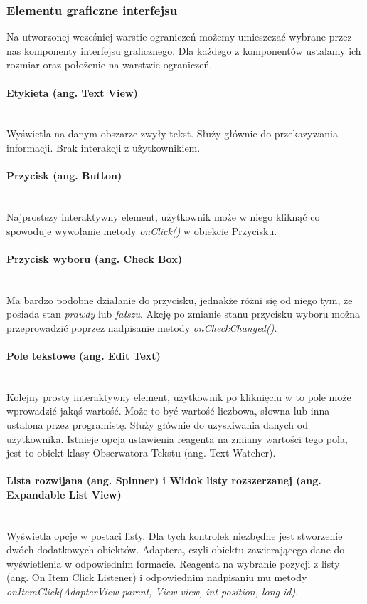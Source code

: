 \documentclass{article}
\numberwithin{equation}{section}
\begin{document}
\subsubsection{Elementu graficzne interfejsu}
Na utworzonej wcześniej warstie ograniczeń możemy umieszczać wybrane przez nas komponenty interfejsu graficznego. Dla każdego z komponentów ustalamy ich rozmiar oraz położenie na warstwie ograniczeń.
\paragraph{Etykieta (ang. Text View)}\mbox{}\\
Wyświetla na danym obszarze zwyły tekst. Służy głównie do przekazywania informacji. Brak interakcji z użytkownikiem.\citep{textview}
\paragraph{Przycisk (ang. Button)}\mbox{}\\
Najprostszy interaktywny element, użytkownik może w niego kliknąć co spowoduje wywołanie metody \textit{onClick()} w obiekcie Przycisku. \citep{button}
\paragraph{Przycisk wyboru (ang. Check Box)}\mbox{}\\
Ma bardzo podobne działanie do przycisku, jednakże różni się od niego tym, że posiada stan \textit{prawdy} lub \textit{fałszu}. Akcję po zmianie stanu przycisku wyboru można przeprowadzić poprzez nadpisanie metody \textit{onCheckChanged()}.
\paragraph{Pole tekstowe (ang. Edit Text)}\mbox{}\\
Kolejny prosty interaktywny element, użytkownik po kliknięciu w to pole może wprowadzić jakąś wartość. Może to być wartość liczbowa, słowna lub inna ustalona przez programistę. Służy głównie do uzyskiwania danych od użytkownika. Istnieje opcja ustawienia reagenta na zmiany wartości tego pola, jest to obiekt klasy Obserwatora Tekstu (ang. Text Watcher).\citep{edittext}
\paragraph{Lista rozwijana (ang. Spinner) i Widok listy rozszerzanej (ang. Expandable List View)}\mbox{}\\
Wyświetla opcje w postaci listy. Dla tych kontrolek niezbędne jest stworzenie dwóch dodatkowych obiektów. Adaptera, czyli obiektu zawierającego dane do wyświetlenia w odpowiednim formacie. Reagenta na wybranie pozycji z listy (ang. On Item Click Listener) i odpowiednim nadpisaniu mu metody \textit{onItemClick(AdapterView parent, View view, int position, long id)}.\citep{adapterview}
\end{document}
